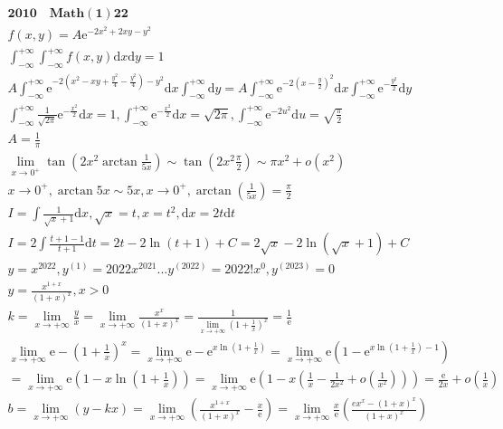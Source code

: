 \documentclass{article}
\begin{document}
\clearpage 
\begin{align*}
    \mathbf{2010 \quad Math(1)22 } \\
    f(x,y) = A \mathrm{e}^{-2x^2+2xy-y^2} \\
    \int_{-\infty}^{+\infty}\int_{-\infty}^{+\infty} f(x,y) \mathrm{d}x\mathrm{d}y = 1 \\ 
    A  \int_{-\infty}^{+\infty} \mathrm{e}^{-2(x^2-xy+\frac{y^2}{4}-\frac{y^2}{4})-y^2} \mathrm{d}x\int_{-\infty}^{+\infty}\mathrm{d}y=A\int_{-\infty}^{+\infty}\mathrm{e}^{-2(x-\frac{y}{2})^2}\mathrm{d}x\int_{-\infty}^{+\infty}\mathrm{e}^{-\frac{y^2}{2}}\mathrm{d}y \\
    \int_{-\infty}^{+\infty}\frac{1}{\sqrt{2\pi}}\mathrm{e}^{-\frac{x^2}{2}} \mathrm{d}x = 1 ,\int_{-\infty}^{+\infty}\mathrm{e}^{-\frac{x^2}{2}} \mathrm{d}x = \sqrt{2\pi},\int_{-\infty}^{+\infty}\mathrm{e}^{-2u^2} \mathrm{d}u = \sqrt{\frac{\pi}{2}} \\
    A = \frac{1}{\pi} \\
    \lim_{x \to 0^{+}}\tan \left(2x^2 \arctan\frac{1}{5x}\right) \sim \tan\left(2x^2 \frac{\pi}{2}\right) \sim \pi x^2 + o(x^2)\\
    x \to 0^{+} ,\arctan 5x \sim 5x, x \to 0^{+} , \arctan\left(\frac{1}{5x}\right) = \frac{\pi}{2} \\
    I = \int \frac{1}{\sqrt{x}+1}\mathrm{d}x , \sqrt{x} = t,x = t^2,\mathrm{d}x = 2t\mathrm{d}t\\
    I = 2\int \frac{t+1-1}{t+1} \mathrm{d}t = 2t-2\ln(t+1)+C = 2\sqrt{x}-2\ln(\sqrt{x}+1)+C \\
    y = x^{2022} , y^{(1)} = 2022x^{2021}...y^{(2022)} = 2022!x^{0}, y^{(2023)}=0\\
    y = \frac{x^{1+x}}{(1+x)^{x}} ,x > 0 \\
    k = \lim_{x \to +\infty} \frac{y}{x} = \lim_{x \to +\infty}\frac{x^{x}}{(1+x)^{x}} = \frac{1}{\lim_{x \to +\infty}\left(1+\frac{1}{x}\right)^{x}}  = \frac{1}{\mathrm{e}} \\
    \lim_{x \to +\infty} \mathrm{e} - \left(1+\frac{1}{x}\right)^{x} = \lim_{x \to +\infty} \mathrm{e} - \mathrm{e}^{x\ln\left(1+\frac{1}{x}\right)} = \lim_{x \to +\infty}\mathrm{e}\left(1-\mathrm{e}^{x\ln\left(1+\frac{1}{x}\right)-1}\right) \\
    = \lim_{x \to +\infty}\mathrm{e}\left(1-x\ln\left(1+\frac{1}{x}\right)\right) = \lim_{x \to +\infty} \mathrm{e}\left(1-x\left(\frac{1}{x}-\frac{1}{2x^2}+o(\frac{1}{x^2})\right)\right) = \frac{\mathrm{e}}{2x} + o(\frac{1}{x})\\
    b = \lim_{x \to +\infty} (y - kx) = \lim_{x \to +\infty}\left(\frac{x^{1+x}}{(1+x)^{x}}-\frac{x}{\mathrm{e}} \right) = \lim_{x \to +\infty} \frac{x}{\mathrm{e}}\left(\frac{ex^{x}-(1+x)^{x}}{(1+x)^{x}} \right) \\

\end{align*}
\end{document}
